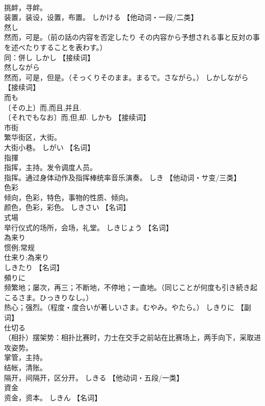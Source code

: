 \documentclass[8pt]{extreport}
\begin{document}
\begin{CJK}{UTF8}{min}
\\	挑衅，寻衅。 
\\	装置，装设，设置，布置。	しかける		【他动词・一段/二类】
\\	然し	
\\	然而，可是。（前の話の内容を否定したり その内容から予想される事と反対の事を述べたりすることを表わす。） 
\\	同：併し	しかし		【接续词】
\\	然しながら	
\\	然而，可是，但是。（そっくりそのまま。まるで。さながら。）	しかしながら		【接续词】
\\	而も	
\\	〔その上〕而,而且,并且. 
\\	〔それでもなお〕而,但,却.	しかも		【接续词】
\\	市街	
\\	繁华街区，大街。 
\\	大街小巷。	しがい		【名词】
\\	指揮	
\\	指挥，主持。发令调度人员。 
\\	指挥。通过身体动作及指挥棒统率音乐演奏。	しき		【他动词・サ变/三类】
\\	色彩	
\\	倾向，色彩，特色，事物的性质、倾向。 
\\	颜色，色彩，彩色。	しきさい		【名词】
\\	式場	
\\	举行仪式的场所，会场，礼堂。	しきじょう		【名词】
\\	為来り	
\\	惯例;常规 
\\	仕来り;為来り 
\\	しきたり		【名词】
\\	頻りに	
\\	频繁地；屡次，再三；不断地，不停地；一直地。（同じことが何度も引き続き起こるさま。ひっきりなし。） 
\\	热心；强烈。（程度・度合いが著しいさま。むやみ。やたら。）	しきりに		【副词】
\\	仕切る	
\\	（相扑）摆架势：相扑比赛时，力士在交手之前站在比赛场上，两手向下，采取进攻姿势。 
\\	掌管，主持。 
\\	结帐，清账。 
\\	隔开，间隔开，区分开。	しきる		【他动词・五段/一类】
\\	資金	
\\	资金，资本。	しきん		【名词】

\end{CJK}
\end{document}
